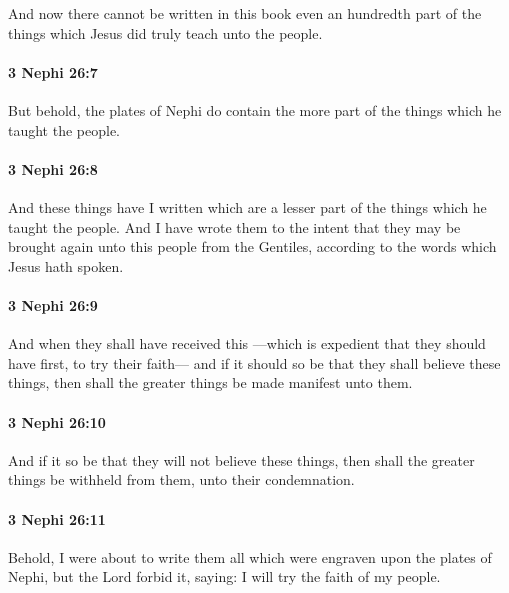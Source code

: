 			And now there cannot be written in this book
			even an hundredth part of the things
			which Jesus did truly teach unto the people.

		\paragraph{3 Nephi 26:7} %
			\label{3NEPHI-26-7}

			But behold, the plates of Nephi do contain
			the more part of the things which he taught the people.

		\paragraph{3 Nephi 26:8} %
			\label{3NEPHI-26-8}

			And these things have I written
			which are a lesser part of the things which he taught the people.
			And I have wrote them to the intent
			that they may be brought again unto this people from the Gentiles,
			according to the words which Jesus hath spoken.

		\paragraph{3 Nephi 26:9} %
			\label{3NEPHI-26-9}

			And when they shall have received this
			---which is expedient that they should have first, to try their faith---
			and if it should so be that they shall believe these things,
			then shall the greater things be made manifest unto them.

		\paragraph{3 Nephi 26:10} %
			\label{3NEPHI-26-10}

			And if it so be that they will not believe these things,
			then shall the greater things be withheld from them, unto their condemnation.

		\paragraph{3 Nephi 26:11} %
			\label{3NEPHI-26-11}

			Behold, I were about to write them all
			which were engraven upon the plates of Nephi,
			but the Lord forbid it, saying:
			I will try the faith of my people.

